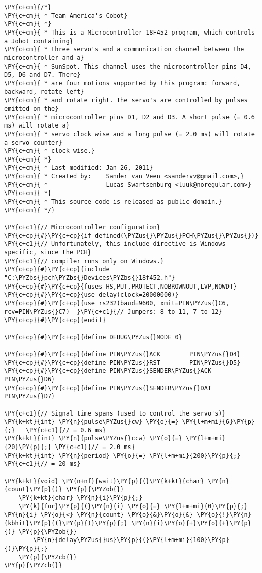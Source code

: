 \begin{Verbatim}[commandchars=\\\{\}]
\PY{c+cm}{/*}
\PY{c+cm}{ * Team America's Cobot}
\PY{c+cm}{ *}
\PY{c+cm}{ * This is a Microcontroller 18F452 program, which controls a Jobot containing}
\PY{c+cm}{ * three servo's and a communication channel between the microcontroller and a}
\PY{c+cm}{ * SunSpot. This channel uses the microcontroller pins D4, D5, D6 and D7. There}
\PY{c+cm}{ * are four motions supported by this program: forward, backward, rotate left}
\PY{c+cm}{ * and rotate right. The servo's are controlled by pulses emitted on the}
\PY{c+cm}{ * microcontroller pins D1, D2 and D3. A short pulse (= 0.6 ms) will rotate a}
\PY{c+cm}{ * servo clock wise and a long pulse (= 2.0 ms) will rotate a servo counter}
\PY{c+cm}{ * clock wise.}
\PY{c+cm}{ *}
\PY{c+cm}{ * Last modified: Jan 26, 2011}
\PY{c+cm}{ * Created by:    Sander van Veen <sandervv@gmail.com>,}
\PY{c+cm}{ *                Lucas Swartsenburg <luuk@noregular.com>}
\PY{c+cm}{ *}
\PY{c+cm}{ * This source code is released as public domain.}
\PY{c+cm}{ */}

\PY{c+c1}{// Microcontroller configuration}
\PY{c+cp}{#}\PY{c+cp}{if defined(\PYZus{}\PYZus{}PCH\PYZus{}\PYZus{})}
\PY{c+c1}{// Unfortunately, this include directive is Windows specific, since the PCH}
\PY{c+c1}{// compiler runs only on Windows.}
\PY{c+cp}{#}\PY{c+cp}{include "C:\PYZbs{}pch\PYZbs{}Devices\PYZbs{}18f452.h"}
\PY{c+cp}{#}\PY{c+cp}{fuses HS,PUT,PROTECT,NOBROWNOUT,LVP,NOWDT}
\PY{c+cp}{#}\PY{c+cp}{use delay(clock=20000000)}
\PY{c+cp}{#}\PY{c+cp}{use rs232(baud=9600, xmit=PIN\PYZus{}C6, rcv=PIN\PYZus{}C7)  }\PY{c+c1}{// Jumpers: 8 to 11, 7 to 12}
\PY{c+cp}{#}\PY{c+cp}{endif}

\PY{c+cp}{#}\PY{c+cp}{define DEBUG\PYZus{}MODE 0}

\PY{c+cp}{#}\PY{c+cp}{define PIN\PYZus{}ACK        PIN\PYZus{}D4}
\PY{c+cp}{#}\PY{c+cp}{define PIN\PYZus{}RST        PIN\PYZus{}D5}
\PY{c+cp}{#}\PY{c+cp}{define PIN\PYZus{}SENDER\PYZus{}ACK PIN\PYZus{}D6}
\PY{c+cp}{#}\PY{c+cp}{define PIN\PYZus{}SENDER\PYZus{}DAT PIN\PYZus{}D7}

\PY{c+c1}{// Signal time spans (used to control the servo's)}
\PY{k+kt}{int} \PY{n}{pulse\PYZus{}cw} \PY{o}{=} \PY{l+m+mi}{6}\PY{p}{;}   \PY{c+c1}{// = 0.6 ms}
\PY{k+kt}{int} \PY{n}{pulse\PYZus{}ccw} \PY{o}{=} \PY{l+m+mi}{20}\PY{p}{;} \PY{c+c1}{// = 2.0 ms}
\PY{k+kt}{int} \PY{n}{period} \PY{o}{=} \PY{l+m+mi}{200}\PY{p}{;}   \PY{c+c1}{// = 20 ms}

\PY{k+kt}{void} \PY{n+nf}{wait}\PY{p}{(}\PY{k+kt}{char} \PY{n}{count}\PY{p}{)} \PY{p}{\PYZob{}}
    \PY{k+kt}{char} \PY{n}{i}\PY{p}{;}
    \PY{k}{for}\PY{p}{(}\PY{n}{i} \PY{o}{=} \PY{l+m+mi}{0}\PY{p}{;} \PY{n}{i} \PY{o}{<} \PY{n}{count} \PY{o}{&}\PY{o}{&} \PY{o}{!}\PY{n}{kbhit}\PY{p}{(}\PY{p}{)}\PY{p}{;} \PY{n}{i}\PY{o}{+}\PY{o}{+}\PY{p}{)} \PY{p}{\PYZob{}}
        \PY{n}{delay\PYZus{}us}\PY{p}{(}\PY{l+m+mi}{100}\PY{p}{)}\PY{p}{;}
    \PY{p}{\PYZcb{}}
\PY{p}{\PYZcb{}}


\end{Verbatim}
